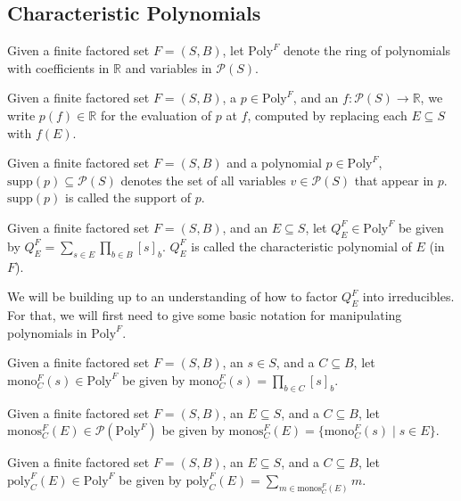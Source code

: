 \documentclass[authordate,onecolumn]{miri-tech-article}
\begin{document}
\subsection{Characteristic Polynomials}
\begin{definition} 
Given a finite factored set $F=(S,B)$, let $\text{Poly}^F$ denote the ring of polynomials with coefficients in $\mathbb{R}$ and variables in $\mathcal{P}(S)$. 
\end{definition}
\begin{definition} 
Given a finite factored set $F=(S,B)$, a $p\in\text{Poly}^F$, and an $f:\mathcal{P}(S)\rightarrow \mathbb R$, we write $p(f)\in \mathbb{R}$ for the evaluation of $p$ at $f$, computed by replacing each $E\subseteq S$ with $f(E)$.
\end{definition}
\begin{definition} 
Given a finite factored set $F=(S,B)$ and a polynomial $p\in \text{Poly}^F$, $\text{supp}(p)\subseteq \mathcal{P}(S)$ denotes the set of all variables $v\in\mathcal{P}(S)$ that appear in $p$. $\text{supp}(p)$ is called the support of $p$.
\end{definition}
\begin{definition} 
Given a finite factored set $F=(S,B)$, and an $E\subseteq S$, let $Q^F_E\in \text{Poly}^F$ be given by $Q^F_E=\sum_{s\in E}\prod_{b\in B}[s]_b$. $Q^F_E$ is called the characteristic polynomial of $E$ (in $F$).
\end{definition}

We will be building up to an understanding of how to factor $Q^F_E$ into irreducibles. For that, we will first need to give some basic notation for manipulating polynomials in $\text{Poly}^F$.

\begin{definition}
Given a finite factored set $F=(S,B)$, an $s\in S$, and a $C\subseteq B$, let $\text{mono}^F_C(s)\in \text{Poly}^F$ be given by $\text{mono}^F_C(s)=\prod_{b\in C}[s]_b$. 
\end{definition}

\begin{definition}
Given a finite factored set $F=(S,B)$, an $E\subseteq S$, and a $C\subseteq B$, let $\text{monos}^F_C(E)\in \mathcal{P}(\text{Poly}^F)$ be given by $\text{monos}^F_C(E)=\{\text{mono}^F_C(s)\mid s\in E\}$. 
\end{definition}

\begin{definition}
Given a finite factored set $F=(S,B)$, an $E\subseteq S$, and a $C\subseteq B$, let $\text{poly}^F_C(E)\in \text{Poly}^F$ be given by $\text{poly}^F_C(E)=\sum_{m\in \text{monos}^F_C(E)}m$. 
\end{definition}
\end{document}
